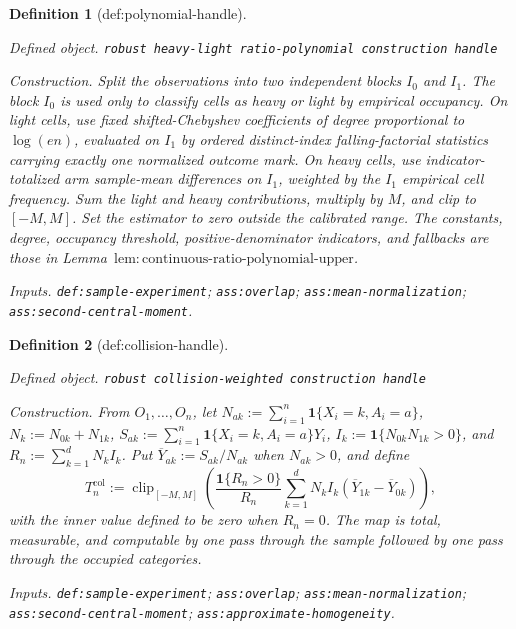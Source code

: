\documentclass{article}
\newtheorem{definition}{Definition}
\begin{document}
\begin{definition}[def:polynomial-handle]\label{def:polynomial-handle}
\par\smallskip\noindent\emph{Defined object.} \texttt{robust heavy-\allowbreak{}light ratio-\allowbreak{}polynomial construction handle}
\par\smallskip\noindent\emph{Construction.} Split the observations into two independent blocks \(I_0\) and \(I_1\).  The block \(I_0\) is used only to classify cells as heavy or light by empirical occupancy.  On light cells, use fixed shifted-Chebyshev coefficients of degree proportional to \(\log(en)\), evaluated on \(I_1\) by ordered distinct-index falling-factorial statistics carrying exactly one normalized outcome mark.  On heavy cells, use indicator-totalized arm sample-mean differences on \(I_1\), weighted by the \(I_1\) empirical cell frequency.  Sum the light and heavy contributions, multiply by \(M\), and clip to \([-M,M]\).  Set the estimator to zero outside the calibrated range.  The constants, degree, occupancy threshold, positive-denominator indicators, and fallbacks are those in Lemma~\(\mathrm{lem:continuous\text{-}ratio\text{-}polynomial\text{-}upper}\).
\par\smallskip\noindent\emph{Inputs.} \texttt{def:\allowbreak{}sample-\allowbreak{}experiment}; \texttt{ass:\allowbreak{}overlap}; \texttt{ass:\allowbreak{}mean-\allowbreak{}normalization}; \texttt{ass:\allowbreak{}second-\allowbreak{}central-\allowbreak{}moment}.
\end{definition}

\begin{definition}[def:collision-handle]\label{def:collision-handle}
\par\smallskip\noindent\emph{Defined object.} \texttt{robust collision-\allowbreak{}weighted construction handle}
\par\smallskip\noindent\emph{Construction.} From \(O_1,\ldots,O_n\), let \(N_{ak}:=\sum_{i=1}^n\mathbf 1\{X_i=k,A_i=a\}\), \(N_k:=N_{0k}+N_{1k}\), \(S_{ak}:=\sum_{i=1}^n\mathbf 1\{X_i=k,A_i=a\}Y_i\), \(I_k:=\mathbf 1\{N_{0k}N_{1k}>0\}\), and \(R_n:=\sum_{k=1}^dN_kI_k\).  Put \(\overline Y_{ak}:=S_{ak}/N_{ak}\) when \(N_{ak}>0\), and define
\[
 T_n^{\mathrm{col}}:=\operatorname{clip}_{[-M,M]}\!\left(
 \frac{\mathbf 1\{R_n>0\}}{R_n}
 \sum_{k=1}^dN_kI_k(\overline Y_{1k}-\overline Y_{0k})
 \right),
\]
with the inner value defined to be zero when \(R_n=0\).  The map is total, measurable, and computable by one pass through the sample followed by one pass through the occupied categories.
\par\smallskip\noindent\emph{Inputs.} \texttt{def:\allowbreak{}sample-\allowbreak{}experiment}; \texttt{ass:\allowbreak{}overlap}; \texttt{ass:\allowbreak{}mean-\allowbreak{}normalization}; \texttt{ass:\allowbreak{}second-\allowbreak{}central-\allowbreak{}moment}; \texttt{ass:\allowbreak{}approximate-\allowbreak{}homogeneity}.
\end{definition}
\end{document}
